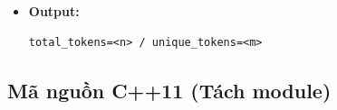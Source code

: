 \begin{itemize}
\begin{itemize}
        \item \textbf{Module 3 (Tokenize):}

        \begin{itemize}
            \item Hàm \texttt{tokenize(const string\& normalized)}
            \item Tách token theo khoảng trắng
        \end{itemize}

        \item \textbf{Module 4 (Đếm tần suất):}

        \begin{itemize}
            \item Dùng:
\begin{lstlisting}
unordered_map<string,int> freq
\end{lstlisting}

            \item Đếm:
            \begin{itemize}
                \item Tổng số token
                \item Số token duy nhất
            \end{itemize}
        \end{itemize}

    \end{itemize}

    \item \textbf{Output:}

\begin{lstlisting}
total_tokens=<n> / unique_tokens=<m>
\end{lstlisting}

\end{itemize}

\subsection{Mã nguồn C++11 (Tách module)}

